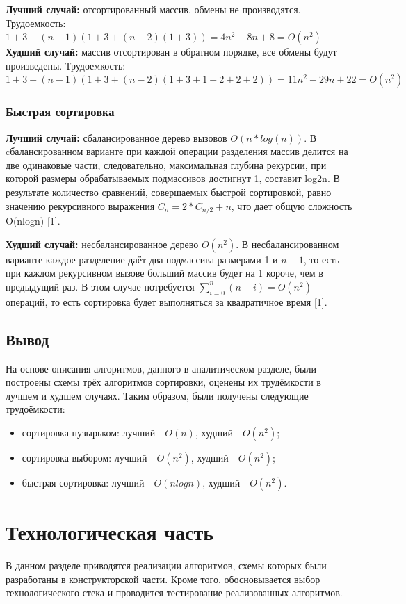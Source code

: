 \documentclass[12pt]{report}
\begin{document}
\textbf{Лучший случай:} отсортированный массив, обмены не производятся.
\newline
Трудоемкость: $1 + 3 + (n - 1)(1 + 3 + (n - 2)(1 + 3)) = 4n^2 - 8n + 8 = O(n^2)$
\newline
\hspace*{5mm}
\textbf{Худший случай:} массив отсортирован в обратном порядке, все обмены будут произведены. \newline
Трудоемкость: $1 + 3 + (n - 1)(1 + 3 + (n - 2)(1 + 3 + 1 + 2 + 2 + 2)) = 11n^2 - 29n + 22 = O(n^2)$

\subsection{Быстрая сортировка}
\textbf{Лучший случай:} сбалансированное дерево вызовов \(O(n*log(n))\). 
В cбалансированном варианте при каждой операции разделения массив делится на две одинаковые части, следовательно, максимальная глубина рекурсии, при которой размеры обрабатываемых подмассивов достигнут 1, составит log2n. В результате количество сравнений, совершаемых быстрой сортировкой, равно значению рекурсивного выражения $C_n = 2 * C_{n / 2} + n$, что дает общую сложность O(nlogn) [1].

\textbf{Худший случай:} несбалансированное дерево $O(n^2)$.
В несбалансированном варианте каждое разделение даёт два подмассива размерами 1 и $n - 1$, то есть при каждом рекурсивном вызове больший массив будет на 1 короче, чем в предыдущий раз. В этом случае потребуется $\sum_{{i=0}}^{n}(n-i)=O(n^{2})$ операций, то есть сортировка будет выполняться за квадратичное время [1].
\section{Вывод}
На основе описания алгоритмов, данного в аналитическом разделе, были построены схемы трёх алгоритмов сортировки, оценены их трудёмкости в лучшем и худшем случаях. Таким образом, были получены следующие трудоёмкости:
\begin{itemize}
\item сортировка пузырьком: лучший - $O(n)$, худший - $O(n^2)$;
\item сортировка выбором: лучший - $O(n^2)$, худший - $O(n^2)$;
\item быстрая сортировка: лучший - $O(nlogn)$, худший - $O(n^2)$.
\end{itemize}

\newpage
\chapter{Технологическая часть}
В данном разделе приводятся реализации алгоритмов, схемы которых были разработаны в конструкторской части. Кроме того, обосновывается выбор технологического стека и проводится тестирование реализованных алгоритмов.
\end{document}
